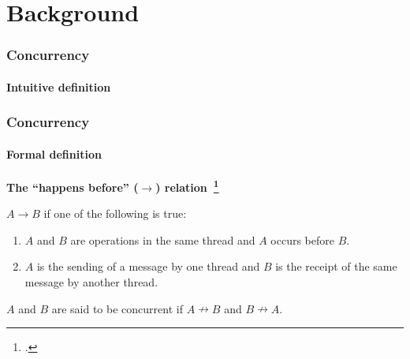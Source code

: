\documentclass{beamer}
\begin{document}
  \section{Background}

  \begin{frame}
    \frametitle{Concurrency}
    \framesubtitle{Intuitive definition}


  \end{frame}

  \begin{frame}
    \frametitle{Concurrency}
    \framesubtitle{Formal definition}

    \textbf{The ``happens before'' ($\rightarrow$) relation~\footcite{Lamport1977}}

    $A \rightarrow B$ if one of the following is true:

    \begin{enumerate}
      \item $A$ and $B$ are operations in the same thread and $A$ occurs before $B$.
      \item $A$ is the sending of a message by one thread and $B$ is the receipt of the same message by another thread.
    \end{enumerate}

    $A$ and $B$ are said to be concurrent if $A \nrightarrow B$ and $B \nrightarrow A$.
  \end{frame}
\end{document}

